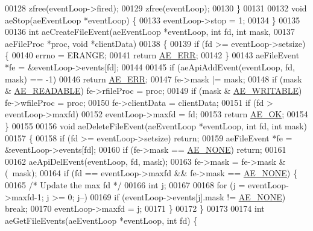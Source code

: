 \begin{DoxyCode}
00128     zfree(eventLoop->fired);
00129     zfree(eventLoop);
00130 \}
00131 
00132 \textcolor{keywordtype}{void} aeStop(aeEventLoop *eventLoop) \{
00133     eventLoop->stop = 1;
00134 \}
00135 
00136 \textcolor{keywordtype}{int} aeCreateFileEvent(aeEventLoop *eventLoop, \textcolor{keywordtype}{int} fd, \textcolor{keywordtype}{int} mask,
00137         aeFileProc *proc, \textcolor{keywordtype}{void} *clientData)
00138 \{
00139     \textcolor{keywordflow}{if} (fd >= eventLoop->setsize) \{
00140         errno = ERANGE;
00141         \textcolor{keywordflow}{return} \hyperlink{ae_8h_aa16dcf7effdf8f8df97f51b1cb51a9df}{AE\_ERR};
00142     \}
00143     aeFileEvent *fe = &eventLoop->events[fd];
00144 
00145     \textcolor{keywordflow}{if} (aeApiAddEvent(eventLoop, fd, mask) == -1)
00146         \textcolor{keywordflow}{return} \hyperlink{ae_8h_aa16dcf7effdf8f8df97f51b1cb51a9df}{AE\_ERR};
00147     fe->mask |= mask;
00148     \textcolor{keywordflow}{if} (mask & \hyperlink{ae_8h_a7a9a2162d007d09739955b4e55c65bf3}{AE\_READABLE}) fe->rfileProc = proc;
00149     \textcolor{keywordflow}{if} (mask & \hyperlink{ae_8h_ab6bfb0366ccb6277112d132c2a2bf500}{AE\_WRITABLE}) fe->wfileProc = proc;
00150     fe->clientData = clientData;
00151     \textcolor{keywordflow}{if} (fd > eventLoop->maxfd)
00152         eventLoop->maxfd = fd;
00153     \textcolor{keywordflow}{return} \hyperlink{ae_8h_afaac43d9573452f9fc6c718f90c4c645}{AE\_OK};
00154 \}
00155 
00156 \textcolor{keywordtype}{void} aeDeleteFileEvent(aeEventLoop *eventLoop, \textcolor{keywordtype}{int} fd, \textcolor{keywordtype}{int} mask)
00157 \{
00158     \textcolor{keywordflow}{if} (fd >= eventLoop->setsize) \textcolor{keywordflow}{return};
00159     aeFileEvent *fe = &eventLoop->events[fd];
00160     \textcolor{keywordflow}{if} (fe->mask == \hyperlink{ae_8h_aea2e33b645e48a3fbb26261005f6df41}{AE\_NONE}) \textcolor{keywordflow}{return};
00161 
00162     aeApiDelEvent(eventLoop, fd, mask);
00163     fe->mask = fe->mask & (~mask);
00164     \textcolor{keywordflow}{if} (fd == eventLoop->maxfd && fe->mask == \hyperlink{ae_8h_aea2e33b645e48a3fbb26261005f6df41}{AE\_NONE}) \{
00165         \textcolor{comment}{/* Update the max fd */}
00166         \textcolor{keywordtype}{int} j;
00167 
00168         \textcolor{keywordflow}{for} (j = eventLoop->maxfd-1; j >= 0; j--)
00169             \textcolor{keywordflow}{if} (eventLoop->events[j].mask != \hyperlink{ae_8h_aea2e33b645e48a3fbb26261005f6df41}{AE\_NONE}) \textcolor{keywordflow}{break};
00170         eventLoop->maxfd = j;
00171     \}
00172 \}
00173 
00174 \textcolor{keywordtype}{int} aeGetFileEvents(aeEventLoop *eventLoop, \textcolor{keywordtype}{int} fd) \{

\end{DoxyCode}
